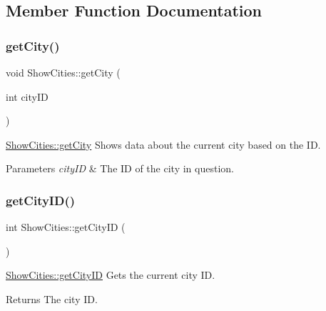 \subsection{Member Function Documentation}
\mbox{\label{class_show_cities_a7a03bcd5374073d6689aed90cc23ce5e}} 
\subsubsection{\texorpdfstring{get\+City()}{getCity()}}
{\footnotesize\ttfamily void Show\+Cities\+::get\+City (\begin{DoxyParamCaption}\item[{int}]{city\+ID }\end{DoxyParamCaption})}



\mbox{\hyperlink{class_show_cities_a7a03bcd5374073d6689aed90cc23ce5e}{Show\+Cities\+::get\+City}} Shows data about the current city based on the ID. 


\begin{DoxyParams}{Parameters}
{\em city\+ID} & The ID of the city in question. \\
\hline
\end{DoxyParams}
\mbox{\label{class_show_cities_ac81b38d6862643619d07f82fe12b5c02}} 
\subsubsection{\texorpdfstring{get\+City\+I\+D()}{getCityID()}}
{\footnotesize\ttfamily int Show\+Cities\+::get\+City\+ID (\begin{DoxyParamCaption}{ }\end{DoxyParamCaption})}



\mbox{\hyperlink{class_show_cities_ac81b38d6862643619d07f82fe12b5c02}{Show\+Cities\+::get\+City\+ID}} Gets the current city ID. 

\begin{DoxyReturn}{Returns}
The city ID. 
\end{DoxyReturn}
\mbox{\label{class_show_cities_a3640b91c66939d0070c3dd6f5b9eb93c}} 
